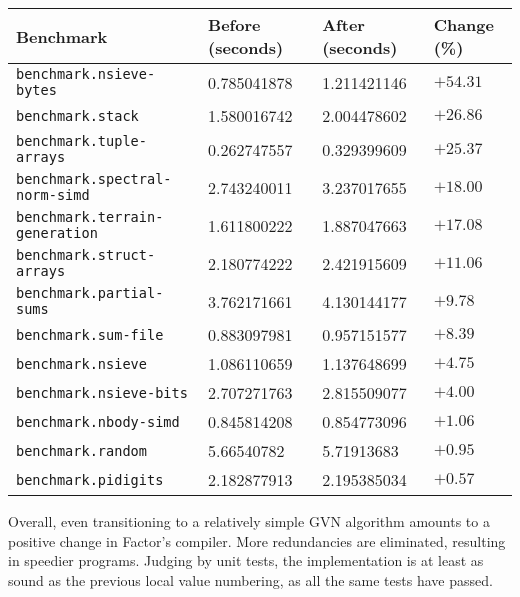 \begin{longtable}{llll}
\toprule
Benchmark & Before (seconds) & After (seconds) & Change (\%) \\
\midrule
\endhead
\texttt{benchmark.nsieve-bytes}             & 0.785041878       & 1.211421146         & $+54.31$    \\
\texttt{benchmark.stack}                    & 1.580016742       & 2.004478602         & $+26.86$    \\
\texttt{benchmark.tuple-arrays}             & 0.262747557       & 0.329399609         & $+25.37$    \\
\texttt{benchmark.spectral-norm-simd}       & 2.743240011       & 3.237017655         & $+18.00$    \\
\texttt{benchmark.terrain-generation}       & 1.611800222       & 1.887047663         & $+17.08$    \\
\texttt{benchmark.struct-arrays}            & 2.180774222       & 2.421915609         & $+11.06$    \\
\texttt{benchmark.partial-sums}             & 3.762171661       & 4.130144177         & $+9.78$     \\
\texttt{benchmark.sum-file}                 & 0.883097981       & 0.957151577         & $+8.39$     \\
\texttt{benchmark.nsieve}                   & 1.086110659       & 1.137648699         & $+4.75$     \\
\texttt{benchmark.nsieve-bits}              & 2.707271763       & 2.815509077         & $+4.00$     \\
\texttt{benchmark.nbody-simd}               & 0.845814208       & 0.854773096         & $+1.06$     \\
\texttt{benchmark.random}                   & 5.66540782        & 5.71913683          & $+0.95$     \\
\texttt{benchmark.pidigits}                 & 2.182877913       & 2.195385034         & $+0.57$     \\
\end{longtable}

Overall, even transitioning to a relatively simple \gls{GVN} algorithm amounts
to a positive change in Factor's compiler.  More redundancies are eliminated,
resulting in speedier programs.  Judging by unit tests, the implementation is
at least as sound as the previous local value numbering,  as all the same tests
have passed.
